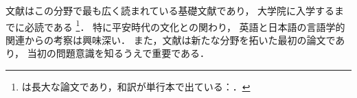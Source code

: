 \documentclass[12pt]{jlreq}
\begin{document}
文献\autocite{hoge2000,foobar1990}はこの分野で最も広く読まれている基礎文献であり，
大学院に入学するまでに必読である
\footnote{\cite{foobar1990}は長大な論文であり，和訳が単行本で出ている：\cite{foobar1995}．}．
特に平安時代の文化との関わり\autocite[25]{hoge2000}，
英語と日本語の言語学的関連からの考察\autocite[30--35]{hoge2000}は興味深い．
また，文献\autocite{hoge2001}は新たな分野を拓いた最初の論文であり，
当初の問題意識を知るうえで重要である．
\printbibliography
\end{document}
